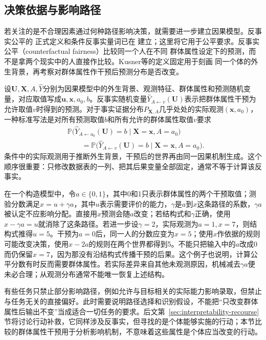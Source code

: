 \subsection{决策依据与影响路径}
\label{sec:fairness-counterfactual-comparison}

若关注的是不合理因素通过何种路径影响决策，就需要进一步建立因果模型。反事实公平的
正式定义和条件反事实量词已在
建立；这里将它用于公平要求。反事实公平（counterfactual fairness）比较同一个人在不同
群体属性设定下的预测，而不是拿两个现实中的人直接作比较。Kusner等的定义固定用于刻画
同一个体的外生背景，再考察对群体属性作干预后预测分布是否改变。

设$\bm U,\bm X,A,\hat Y$分别为因果模型中的外生背景、观测特征、群体属性和预测随机变量，对应取值写成$\bm u,\bm x,a_0,b$。反事实随机变量$\hat Y_{A\leftarrow v}(\bm U)$表示把群体属性干预为允许取值$v$时得到的预测。对于事实证据分布$P_{\bm X,A}$几乎处处的实际观测$(\bm{x},a_0)$，一种标准写法是对所有预测取值$b$和所有允许的群体属性取值$v$要求
\begin{equation}
\begin{aligned}
 &\mathbb P\bigl(\hat Y_{A\leftarrow a_0}(\bm U)=b
       \mid\bm X=\bm x,A=a_0\bigr)\\
 &\qquad=\mathbb P\bigl(\hat Y_{A\leftarrow v}(\bm U)=b
       \mid\bm X=\bm x,A=a_0\bigr).
\end{aligned}
 \label{eq:fairness-counterfactual}
\end{equation}
条件中的实际观测用于推断外生背景，干预后的世界再由同一因果机制生成。这个顺序很重要：只修改数据表的一列、把其后果变量全部固定，通常不等于计算该反事实。

在一个构造模型中，令$a\in\{0,1\}$，其中0和1只表示群体属性的两个干预取值；测验分数满足$x=u+\gamma a$，其中$u$表示需要评价的能力，$\gamma$是$a$到$x$这条路径的系数，$\gamma a$被认定不应影响分配。直接用$x$预测会随$a$改变；若结构式和$\gamma$正确，使用$x-\gamma a=u$就消除了这条路径。若进一步设$\gamma=2$，实际观测为$a=1,x=7$，则结构式推得$u=5$。干预为$a=0$后，同一人的分数应变为$x=5$；使用$x$作依据的规则可能改变决策，使用$x-2a$的规则在两个世界都得到5。不能只把输入中的$a$改成0而仍保留$x=7$，因为那没有沿结构式传播干预的后果。这个例子也说明，计算公平分数有时反而需要群体属性。若实际差异来自其他未观测原因，机械减去$\gamma a$便未必合理；从观测分布通常不能唯一恢复上述结构。

有些任务只禁止部分影响路径，例如允许与目标相关的实际能力影响录取，但禁止与任务无关的直接偏好。此时需要说明路径选择和识别假设，不能把“只改变群体属性后输出不变”当成适合一切任务的要求。后文第~\ref{sec:interpretability-recourse}节将讨论行动补救，它同样涉及反事实，但寻找的是个体能够实施的行动；本节比较的群体属性干预用于分析影响机制，不意味着这些属性是个体应当改变的行动。

